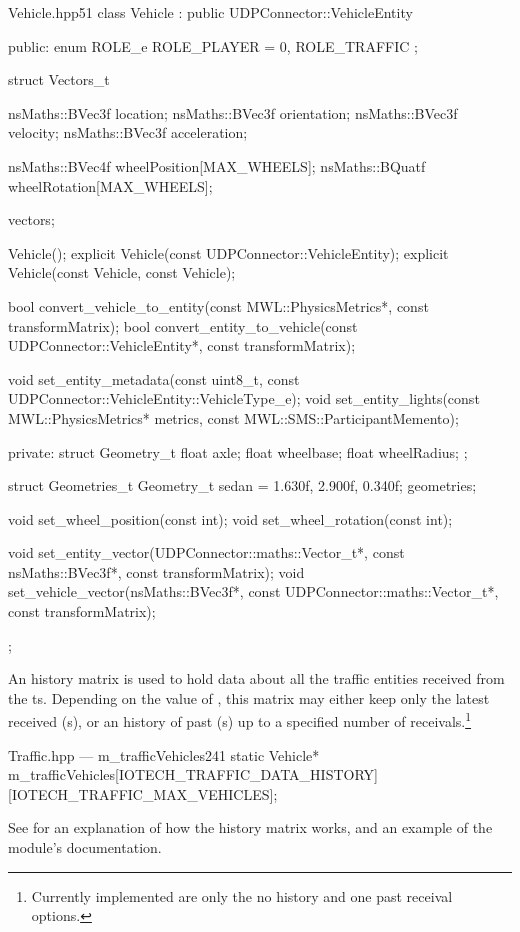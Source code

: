 \begin{codelist}{Vehicle.hpp}{51}
class Vehicle : public UDPConnector::VehicleEntity {
public:
	enum ROLE_e {
		ROLE_PLAYER = 0,
		ROLE_TRAFFIC
	};

	struct Vectors_t {
		nsMaths::BVec3f location;
		nsMaths::BVec3f orientation;
		nsMaths::BVec3f velocity;
		nsMaths::BVec3f acceleration;

		nsMaths::BVec4f wheelPosition[MAX_WHEELS];
		nsMaths::BQuatf wheelRotation[MAX_WHEELS];
	} vectors;

	Vehicle();
	explicit Vehicle(const UDPConnector::VehicleEntity);
	explicit Vehicle(const Vehicle, const Vehicle);

	bool convert_vehicle_to_entity(const MWL::PhysicsMetrics*, const transformMatrix);
	bool convert_entity_to_vehicle(const UDPConnector::VehicleEntity*, const transformMatrix);

	void set_entity_metadata(const uint8_t, const UDPConnector::VehicleEntity::VehicleType_e);
	void set_entity_lights(const MWL::PhysicsMetrics* metrics, const MWL::SMS::ParticipantMemento);

private:
	struct Geometry_t {
		float axle;
		float wheelbase;
		float wheelRadius;
	};

	struct Geometries_t {
		Geometry_t sedan = {1.630f, 2.900f, 0.340f};
	} geometries;

	void set_wheel_position(const int);
	void set_wheel_rotation(const int);

	void set_entity_vector(UDPConnector::maths::Vector_t*, const nsMaths::BVec3f*, const transformMatrix);
	void set_vehicle_vector(nsMaths::BVec3f*, const UDPConnector::maths::Vector_t*, const transformMatrix);
};
\end{codelist}

An history matrix is used to hold data about all the traffic entities received from the \gls{ts}. Depending on the value of , this matrix may either keep only the latest received (s), or an history of past (s) up to a specified number of receivals.\footnote{Currently implemented are only the no history and one past receival options.}

\begin{codelist}{Traffic.hpp --- m\_trafficVehicles}{241}
	static Vehicle* m_trafficVehicles[IOTECH_TRAFFIC_DATA_HISTORY][IOTECH_TRAFFIC_MAX_VEHICLES];
\end{codelist}

See  for an explanation of how the history matrix works, and an example of the module's documentation.

